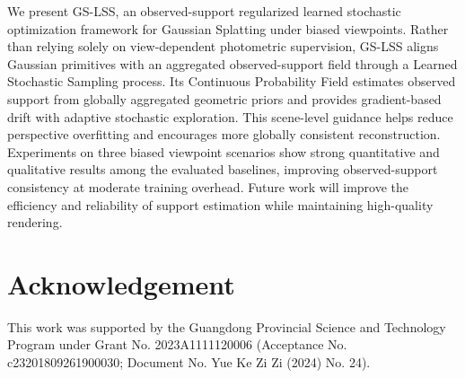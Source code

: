 \documentclass[lettersize,journal]{IEEEtran}
\begin{document}
We present GS-LSS, an observed-support regularized learned stochastic optimization framework for Gaussian Splatting under biased viewpoints. Rather than relying solely on view-dependent photometric supervision, GS-LSS aligns Gaussian primitives with an aggregated observed-support field through a Learned Stochastic Sampling process. Its Continuous Probability Field estimates observed support from globally aggregated geometric priors and provides gradient-based drift with adaptive stochastic exploration. This scene-level guidance helps reduce perspective overfitting and encourages more globally consistent reconstruction. Experiments on three biased viewpoint scenarios show strong quantitative and qualitative results among the evaluated baselines, improving observed-support consistency at moderate training overhead. Future work will improve the efficiency and reliability of support estimation while maintaining high-quality rendering.

\section*{Acknowledgement}
This work was supported by the Guangdong Provincial Science and Technology Program under Grant No. 2023A1111120006 (Acceptance No. c23201809261900030; Document No. Yue Ke Zi Zi (2024) No. 24).




\vfill
\end{document}
